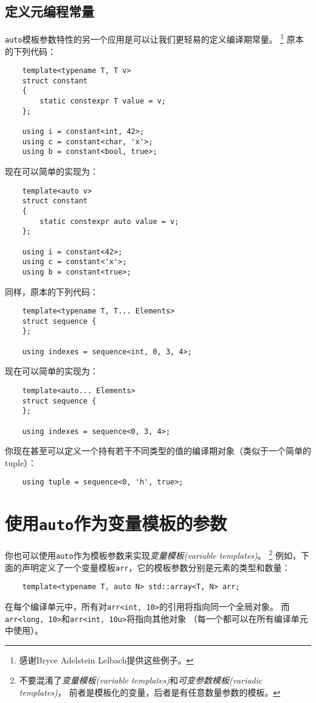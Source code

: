 \subsection{定义元编程常量}
\texttt{auto}模板参数特性的另一个应用是可以让我们更轻易的定义编译期常量。
\footnote{感谢Bryce Adelstein Lelbach提供这些例子。}
原本的下列代码：
\begin{lstlisting}
    template<typename T, T v>
    struct constant
    {
        static constexpr T value = v;
    };

    using i = constant<int, 42>;
    using c = constant<char, 'x'>;
    using b = constant<bool, true>;
\end{lstlisting}
现在可以简单的实现为：
\begin{lstlisting}
    template<auto v>
    struct constant
    {
        static constexpr auto value = v;
    };

    using i = constant<42>;
    using c = constant<'x'>;
    using b = constant<true>;
\end{lstlisting}
同样，原本的下列代码：
\begin{lstlisting}
    template<typename T, T... Elements>
    struct sequence {
    };

    using indexes = sequence<int, 0, 3, 4>;
\end{lstlisting}
现在可以简单的实现为：
\begin{lstlisting}
    template<auto... Elements>
    struct sequence {
    };

    using indexes = sequence<0, 3, 4>;
\end{lstlisting}
你现在甚至可以定义一个持有若干不同类型的值的编译期对象（类似于一个简单的tuple）：
\begin{lstlisting}
    using tuple = sequence<0, 'h', true>;
\end{lstlisting}

\section{使用\texttt{auto}作为变量模板的参数}
你也可以使用\texttt{auto}作为模板参数来实现\emph{变量模板(variable templates)}。
\footnote{不要混淆了\emph{变量模板(variable templates)}和\emph{可变参数模板(variadic templates)}，
前者是模板化的变量，后者是有任意数量参数的模板。}
例如，下面的声明定义了一个变量模板\texttt{arr}，它的模板参数分别是元素的类型和数量：
\begin{lstlisting}
    template<typename T, auto N> std::array<T, N> arr;
\end{lstlisting}
在每个编译单元中，所有对\texttt{arr<int, 10>}的引用将指向同一个全局对象。
而\texttt{arr<long, 10>}和\texttt{arr<int, 10u>}将指向其他对象
（每一个都可以在所有编译单元中使用）。

